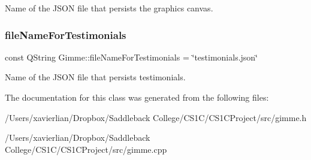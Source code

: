 Name of the J\+S\+ON file that persists the graphics canvas. \mbox{\label{class_gimme_aa9fd95a9aa3dc9734d4f8357c4620efa}} 
\subsubsection{\texorpdfstring{fileNameForTestimonials}{fileNameForTestimonials}}
{\footnotesize\ttfamily const Q\+String Gimme\+::file\+Name\+For\+Testimonials = \char`\"{}testimonials.\+json\char`\"{}}

Name of the J\+S\+ON file that persists testimonials. 

The documentation for this class was generated from the following files\+:\begin{DoxyCompactItemize}
\item 
/\+Users/xavierlian/\+Dropbox/\+Saddleback College/\+C\+S1\+C/\+C\+S1\+C\+Project/src/gimme.\+h\item 
/\+Users/xavierlian/\+Dropbox/\+Saddleback College/\+C\+S1\+C/\+C\+S1\+C\+Project/src/gimme.\+cpp\end{DoxyCompactItemize}
